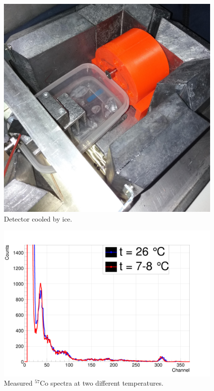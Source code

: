 \begin{figure}[H]
 \centering
 \includegraphics[scale=0.09, angle = 0]{./pictures/chlazeniLedem.jpg}
 \caption{Detector cooled by ice.}
 \label{cooler}
 
\end{figure}



\begin{figure}[H]
 \centering
 \includegraphics[scale=0.13, angle = 0]{./pictures/TempDiff.png}
 \caption{Measured $^{57}$Co spectra at two different temperatures.}
 \label{coolspectr}
 
\end{figure}








